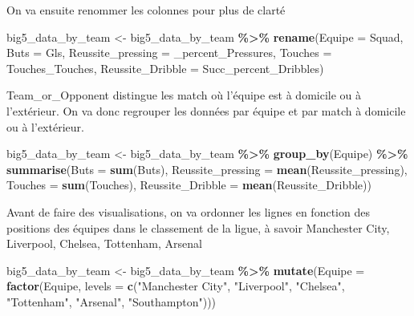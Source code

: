 \documentclass[
]{article}
\newenvironment{Shaded}{\begin{snugshade}}{\end{snugshade}}
\newcommand{\AttributeTok}[1]{\textcolor[rgb]{0.13,0.29,0.53}{#1}}
\newcommand{\FunctionTok}[1]{\textcolor[rgb]{0.13,0.29,0.53}{\textbf{#1}}}
\newcommand{\NormalTok}[1]{#1}
\newcommand{\OtherTok}[1]{\textcolor[rgb]{0.56,0.35,0.01}{#1}}
\newcommand{\SpecialCharTok}[1]{\textcolor[rgb]{0.81,0.36,0.00}{\textbf{#1}}}
\newcommand{\StringTok}[1]{\textcolor[rgb]{0.31,0.60,0.02}{#1}}
\begin{document}
On va ensuite renommer les colonnes pour plus de clarté

\begin{Shaded}
\begin{Highlighting}[]
\NormalTok{big5\_data\_by\_team }\OtherTok{\textless{}{-}}\NormalTok{ big5\_data\_by\_team }\SpecialCharTok{\%\textgreater{}\%} \FunctionTok{rename}\NormalTok{(}\AttributeTok{Equipe =}\NormalTok{ Squad, }\AttributeTok{Buts =}\NormalTok{ Gls, }\AttributeTok{Reussite\_pressing =} \StringTok{\textquotesingle{}\_percent\_Pressures\textquotesingle{}}\NormalTok{, }\AttributeTok{Touches =}\NormalTok{ Touches\_Touches, }\AttributeTok{Reussite\_Dribble =}\NormalTok{ Succ\_percent\_Dribbles)}
\end{Highlighting}
\end{Shaded}

Team\_or\_Opponent distingue les match où l'équipe est à domicile ou à
l'extérieur. On va donc regrouper les données par équipe et par match à
domicile ou à l'extérieur.

\begin{Shaded}
\begin{Highlighting}[]
\NormalTok{big5\_data\_by\_team }\OtherTok{\textless{}{-}}\NormalTok{ big5\_data\_by\_team }\SpecialCharTok{\%\textgreater{}\%} \FunctionTok{group\_by}\NormalTok{(Equipe) }\SpecialCharTok{\%\textgreater{}\%} \FunctionTok{summarise}\NormalTok{(}\AttributeTok{Buts =} \FunctionTok{sum}\NormalTok{(Buts), }\AttributeTok{Reussite\_pressing =} \FunctionTok{mean}\NormalTok{(Reussite\_pressing), }\AttributeTok{Touches =} \FunctionTok{sum}\NormalTok{(Touches), }\AttributeTok{Reussite\_Dribble =} \FunctionTok{mean}\NormalTok{(Reussite\_Dribble))}
\end{Highlighting}
\end{Shaded}

Avant de faire des visualisations, on va ordonner les lignes en fonction
des positions des équipes dans le classement de la ligue, à savoir
Manchester City, Liverpool, Chelsea, Tottenham, Arsenal

\begin{Shaded}
\begin{Highlighting}[]
\NormalTok{big5\_data\_by\_team }\OtherTok{\textless{}{-}}\NormalTok{ big5\_data\_by\_team }\SpecialCharTok{\%\textgreater{}\%} \FunctionTok{mutate}\NormalTok{(}\AttributeTok{Equipe =} \FunctionTok{factor}\NormalTok{(Equipe, }\AttributeTok{levels =} \FunctionTok{c}\NormalTok{(}\StringTok{"Manchester City"}\NormalTok{, }\StringTok{"Liverpool"}\NormalTok{, }\StringTok{"Chelsea"}\NormalTok{, }\StringTok{"Tottenham"}\NormalTok{, }\StringTok{"Arsenal"}\NormalTok{, }\StringTok{"Southampton"}\NormalTok{)))}
\end{Highlighting}
\end{Shaded}
\end{document}
